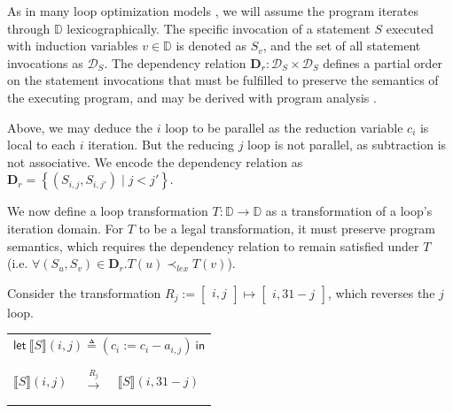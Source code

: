 \documentclass[review, acmsmall, nonacm]{acmart}
\newcommand{\domain}{\mathbb{D}}
\begin{document}
As in many loop optimization models \cite{xueUnimodularTransformationsNonperfectly1997,grosserPolyhedralASTGeneration2015,chenCHiLLFrameworkComposing2008}, we will assume the program iterates through $\domain$ lexicographically. The specific invocation of a statement $S$ executed with induction variables $v \in \domain$ is denoted as $S_{v}$, and the set of all statement invocations as $\mathcal{D}_S$.  The dependency relation $\mathbf{D}_r : \mathcal{D}_S \times \mathcal{D}_S $ defines a partial order on the statement invocations that must be fulfilled to preserve the semantics of the executing program, and may be derived with program analysis \cite{banerjeeSingleLoops1997}.

Above, we may deduce the $i$ loop to be parallel as the reduction variable $c_i$ is local to each $i$ iteration. But the reducing $j$ loop is not parallel, as subtraction is not associative. We encode the dependency relation as $\mathbf{D}_r = \left \{ (S_{i,j}, S_{i,j'}) \mid j < j' \right \}$.

We now define a loop transformation $T: \domain \to \domain$ as a transformation of a loop's iteration domain. For $T$ to be a legal transformation, it must preserve program semantics, which requires the dependency relation to remain satisfied under $T$ (i.e. $\forall (S_u,S_v) \in \mathbf{D}_r . T(u) \prec_{lex} T(v)$).

Consider the transformation 
$R_j := \begin{bmatrix}
    i, j
  \end{bmatrix}
  \mapsto 
  \begin{bmatrix}
    i, 31 - j
  \end{bmatrix}$, which reverses the $j$ loop. 

\begin{tabular}{m{}m{}m{}} \\
\multicolumn{3}{p{0.9\textwidth}}{
  $\mathsf{let }~ \lBrack  S \rBrack (i,j) \triangleq \left( c_i := c_i - a_{i,j} \right) ~\mathsf{in}$ 
}
\\
\begin{algorithmic}
  \ForAll {$i \in [0,1024)$}  
    \For {$j \in [0, 32)$}  
      \State $ \lBrack  S \rBrack (i,j) $
    \EndFor
  \EndFor
\end{algorithmic}
&
$\xrightarrow{R_j}$
&
\begin{algorithmic}
  \ForAll {$i \in [0,1024)$}  
    \For {$j \in [0, 32)$}  
      \State $ \lBrack  S \rBrack (i,31-j) $
    \EndFor
  \EndFor
\end{algorithmic}
\end{tabular}
\end{document}
